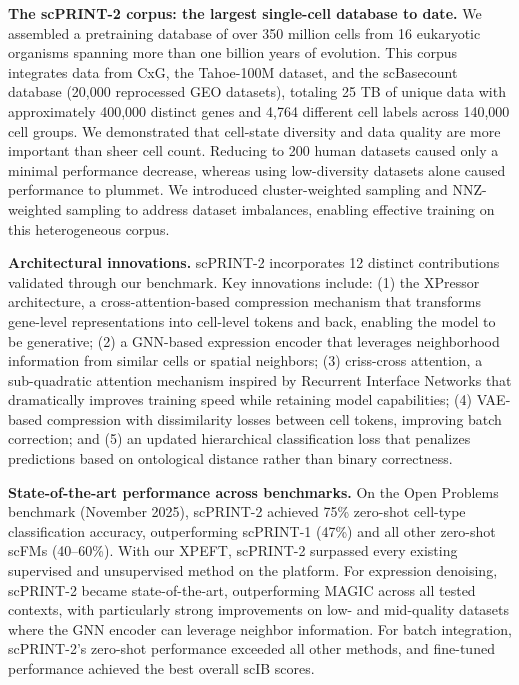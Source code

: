 \textbf{The \gls{scPRINT}-2 corpus: the largest single-cell database to date.} We assembled a
pretraining database of over 350 million cells from 16 eukaryotic organisms spanning more than one
billion years of evolution. This corpus integrates data from \gls{CxG}, the Tahoe-100M dataset,
and the scBasecount database (20,000 reprocessed \gls{GEO} datasets), totaling 25 TB of unique
data with approximately 400,000 distinct genes and 4,764 different cell labels across 140,000 cell
groups. We demonstrated that cell-state diversity and data quality are more important than sheer
cell count. Reducing to 200 human datasets caused only a minimal performance decrease, whereas
using low-diversity datasets alone caused performance to plummet. We introduced cluster-weighted
sampling and \gls{NNZ}-weighted sampling to address dataset imbalances, enabling effective
training on this heterogeneous corpus.

\textbf{Architectural innovations.} \gls{scPRINT}-2 incorporates 12 distinct contributions
validated through our benchmark. Key innovations include: (1) the XPressor architecture, a
cross-attention-based compression mechanism that transforms gene-level representations into
cell-level tokens and back, enabling the model to be generative; (2) a \gls{GNN}-based expression
encoder that leverages neighborhood information from similar cells or spatial neighbors; (3)
criss-cross attention, a sub-quadratic attention mechanism inspired by Recurrent Interface
Networks that dramatically improves training speed while retaining model capabilities; (4)
\gls{VAE}-based compression with dissimilarity losses between cell tokens, improving batch
correction; and (5) an updated hierarchical classification loss that penalizes predictions based
on ontological distance rather than binary correctness.

\textbf{State-of-the-art performance across benchmarks.} On the Open Problems benchmark (November
2025), \gls{scPRINT}-2 achieved 75\% zero-shot cell-type classification accuracy, outperforming
\gls{scPRINT}-1 (47\%) and all other zero-shot \glspl{scFM} (40--60\%). With our \gls{XPEFT},
\gls{scPRINT}-2 surpassed every existing supervised and unsupervised method on the platform. For
expression denoising, \gls{scPRINT}-2 became state-of-the-art, outperforming MAGIC across all
tested contexts, with particularly strong improvements on low- and mid-quality datasets where the
\gls{GNN} encoder can leverage neighbor information. For batch integration, \gls{scPRINT}-2's
zero-shot performance exceeded all other methods, and fine-tuned performance achieved the best
overall \gls{scIB} scores.

